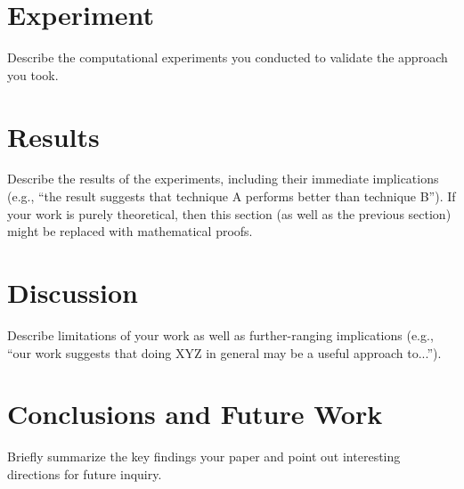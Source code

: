 \documentclass{article}
\begin{document}
\section{Experiment}
Describe the computational experiments you conducted to validate the approach you took.

\section{Results}
Describe the results of the experiments, including their immediate implications (e.g., ``the result suggests that technique A performs better
than technique B''). If your work is purely theoretical, then this section (as well as the previous section) might be replaced with mathematical proofs.

\section{Discussion}
Describe limitations of your work as well as further-ranging implications (e.g., ``our work suggests that doing XYZ in general may be a useful approach to...'').

\section{Conclusions and Future Work}
Briefly summarize the key findings your paper and point out interesting directions for future inquiry.



\end{document}
